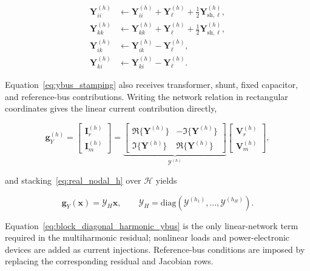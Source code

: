 \documentclass[journal]{IEEEtran}
\begin{document}
\begin{subequations}
\label{eq:ybus_stamping}
\begin{align}
    \mathbf{Y}_{ii}^{(h)} &\leftarrow \mathbf{Y}_{ii}^{(h)} + \mathbf{Y}_{\ell}^{(h)} + \frac{1}{2}\mathbf{Y}_{\mathrm{sh},\ell}^{(h)}, \\
    \mathbf{Y}_{kk}^{(h)} &\leftarrow \mathbf{Y}_{kk}^{(h)} + \mathbf{Y}_{\ell}^{(h)} + \frac{1}{2}\mathbf{Y}_{\mathrm{sh},\ell}^{(h)}, \\
    \mathbf{Y}_{ik}^{(h)} &\leftarrow \mathbf{Y}_{ik}^{(h)} - \mathbf{Y}_{\ell}^{(h)}, \\
    \mathbf{Y}_{ki}^{(h)} &\leftarrow \mathbf{Y}_{ki}^{(h)} - \mathbf{Y}_{\ell}^{(h)}.
\end{align}
\end{subequations}

Equation~\eqref{eq:ybus_stamping} also receives transformer, shunt, fixed
capacitor, and reference-bus contributions. Writing the network relation in
rectangular coordinates gives the linear current contribution directly,

\begin{equation}
\mathbf{g}_{Y}^{(h)}=
\begin{bmatrix}\mathbf{I}_{r}^{(h)}\\ \mathbf{I}_{m}^{(h)}\end{bmatrix}
=
\underbrace{
\begin{bmatrix}
\Re\{\mathbf{Y}^{(h)}\}&-\Im\{\mathbf{Y}^{(h)}\}\\
\Im\{\mathbf{Y}^{(h)}\}& \Re\{\mathbf{Y}^{(h)}\}
\end{bmatrix}}_{\mathcal{Y}^{(h)}}
\begin{bmatrix}\mathbf{V}_{r}^{(h)}\\ \mathbf{V}_{m}^{(h)}\end{bmatrix},
    \label{eq:real_nodal_h}
\end{equation}

\noindent and stacking~\eqref{eq:real_nodal_h} over
$\mathcal{H}$ yields

\begin{equation}
\mathbf{g}_{Y}(\mathbf{x})=\mathcal{Y}_{H}\mathbf{x},\qquad
\mathcal{Y}_{H}=\mathrm{diag}\!\left(
\mathcal{Y}^{(h_1)},\ldots,\mathcal{Y}^{(h_H)}\right).
    \label{eq:block_diagonal_harmonic_ybus}
\end{equation}

Equation~\eqref{eq:block_diagonal_harmonic_ybus} is the only linear-network
term required in the multiharmonic residual; nonlinear loads and
power-electronic devices are added as current injections. Reference-bus
conditions are imposed by replacing the corresponding residual and Jacobian
rows.
\end{document}
